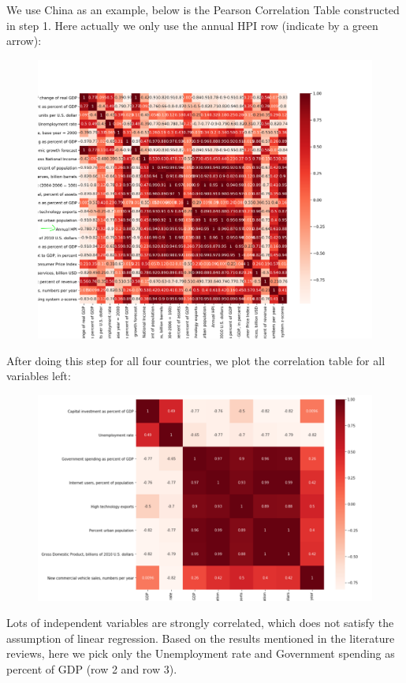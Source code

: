\documentclass[11pt]{article}
\begin{document}
We use China as an example, below is the Pearson Correlation Table constructed in step 1. Here actually we only use the annual HPI row (indicate by a green arrow):
\begin{figure}[H]
\begin{center}
    \includegraphics[width=1.0\textwidth]{./image/CorrelationTable1.png}
\end{center}
\end{figure}
After doing this step for all four countries, we plot the correlation table for all variables left:
\begin{figure}[H]
\begin{center}
    \includegraphics[width=1.0\textwidth]{./image/CorrelationTable2.png}
\end{center}
\end{figure}
Lots of independent variables are strongly correlated, which does not satisfy the assumption of linear regression. Based on the results mentioned in the literature reviews, here we pick only the Unemployment rate and Government spending as percent of GDP (row 2 and row 3).
\end{document}
